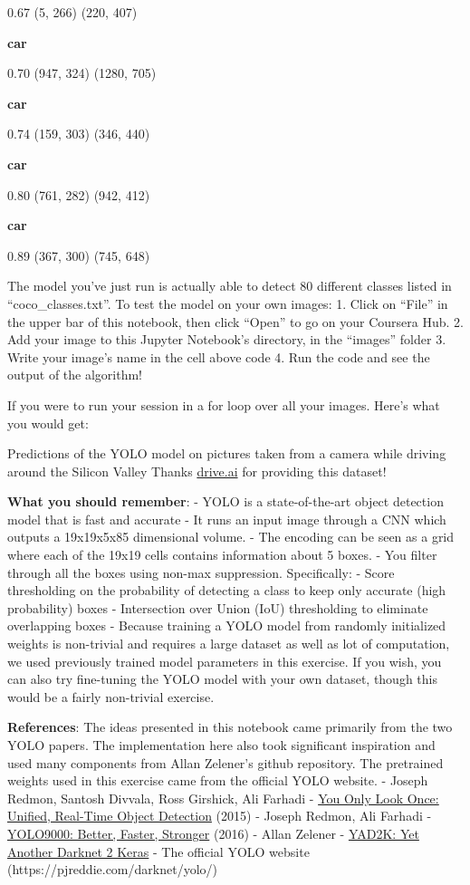 \documentclass[11pt]{article}
\begin{document}
0.67 (5, 266) (220, 407)

\textbf{car}

0.70 (947, 324) (1280, 705)

\textbf{car}

0.74 (159, 303) (346, 440)

\textbf{car}

0.80 (761, 282) (942, 412)

\textbf{car}

0.89 (367, 300) (745, 648)

    The model you've just run is actually able to detect 80 different
classes listed in ``coco\_classes.txt''. To test the model on your own
images: 1. Click on ``File'' in the upper bar of this notebook, then
click ``Open'' to go on your Coursera Hub. 2. Add your image to this
Jupyter Notebook's directory, in the ``images'' folder 3. Write your
image's name in the cell above code 4. Run the code and see the output
of the algorithm!

If you were to run your session in a for loop over all your images.
Here's what you would get:

Predictions of the YOLO model on pictures taken from a camera while
driving around the Silicon Valley Thanks
\href{https://www.drive.ai/}{drive.ai} for providing this dataset!

     \textbf{What you should remember}: - YOLO is a state-of-the-art object
detection model that is fast and accurate - It runs an input image
through a CNN which outputs a 19x19x5x85 dimensional volume. - The
encoding can be seen as a grid where each of the 19x19 cells contains
information about 5 boxes. - You filter through all the boxes using
non-max suppression. Specifically: - Score thresholding on the
probability of detecting a class to keep only accurate (high
probability) boxes - Intersection over Union (IoU) thresholding to
eliminate overlapping boxes - Because training a YOLO model from
randomly initialized weights is non-trivial and requires a large dataset
as well as lot of computation, we used previously trained model
parameters in this exercise. If you wish, you can also try fine-tuning
the YOLO model with your own dataset, though this would be a fairly
non-trivial exercise.

    \textbf{References}: The ideas presented in this notebook came primarily
from the two YOLO papers. The implementation here also took significant
inspiration and used many components from Allan Zelener's github
repository. The pretrained weights used in this exercise came from the
official YOLO website. - Joseph Redmon, Santosh Divvala, Ross Girshick,
Ali Farhadi - \href{https://arxiv.org/abs/1506.02640}{You Only Look
Once: Unified, Real-Time Object Detection} (2015) - Joseph Redmon, Ali
Farhadi - \href{https://arxiv.org/abs/1612.08242}{YOLO9000: Better,
Faster, Stronger} (2016) - Allan Zelener -
\href{https://github.com/allanzelener/YAD2K}{YAD2K: Yet Another Darknet
2 Keras} - The official YOLO website
(https://pjreddie.com/darknet/yolo/)
\end{document}

